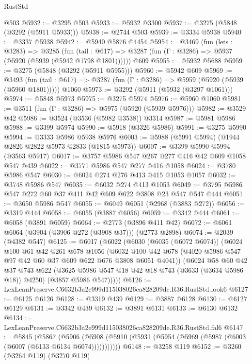\begin{lexlean}{RustStd}
\begin{coremodule}
    @503
@5932 := @3295 @503
@5933 := @5932 @3300
@5937 := @3275 (@5848 (@3292 (@5911 @5933)))
@5938 := @2744 @503
@5939 := @3334 @5938
@5940 := @3337 @5938
@5942 := @5940 @5876 @4454
@5954 := @3469
    (fun (lets : @3283) =>
    @3285
      (fun (tail : @617) => @3287 (fun (Γ : @3286) => @5937 (@5920 (@5939 (@5942 @1798 @1801))))))
    @609
@5955 := @5932 @5688
@5959 := @3275 (@5848 (@3292 (@5911 @5955)))
@5960 := @5942 @609
@5969 := @3493
    (fun (tail : @617) => @3287 (fun (Γ : @3286) => @5959 (@5920 (@5939 (@5960 @1801)))))
    @1060
@5973 := @3292 (@5911 (@5932 (@3297 @1061)))
@5974 := @5848 @5973
@5975 := @3275 @5974
@5976 := @5960 @1060
@5981 := @3511 (fun (Γ : @3286) => @5975 (@5920 (@5939 @5976)))
@5982 := @3529 @42
@5986 := @3524 (@3536 (@5982 @3538)) @3314
@5987 := @5981 @5986
@5988 := @3399 @5974
@5990 := @5918 (@3326 @5986)
@5991 := @3275 @5990
@5994 := @3333 @5986 @5938 @5976
@6003 := @5988 (@5991 @5994) (@1944 @2826 @2822 @5973 @2833 (@1815 @5973))
@6007 := @3399 @5990 @5994 (@3563 @5917)
@6017 := @3757 @5986 @547 @267 @277 @416 @42 @609 @1058 @547 @439
@6022 := @3771 @5986 @547 @277 @416 @1058
@6024 := @3780 @5986 @547
@6030 := @6024 @274 @276 @413 @415 @1053 @1057
@6032 := @3748 @5986 @547
@6035 := @6032 @274 @413 @1053
@6049 := @3795 @5986 @547 @272 @60 @37 @411 @42 @609 @622 @3808 @23 @547 @547 @444
@6051 := @3650 @5986 @547
@6055 := @6049 @6051 (@2968 (@3883 @272))
@6056 := @3319 @444
@6058 := @6055 (@3887 @6056)
@6059 := @3342 @444
@6061 := @6058 (@3891 @6059)
@6064 := @2773 (@3896 @411 @42)
@6072 := @6061 @6064 (@3904 (@3906 @272 (@3908 @37))) (@2773 @2898)
@6074 := @2039 (@4382 @547)
@6125 := @6017
    (@6022
      (@6030
        (@6035 (@6072 @6074))
        (@6024
          @100
          @61
          @42
          @261
          @678
          @1056
          (@6032 @100 @42 @678 (@4020 @5986 @547 @97 @42 @60 @37 @609 @622 @676 @3808 @6051 @4041))
          (@6024
            @58
            @60
            @42
            @37
            @743
            @622
            (@3625 @5986 @547 @18 @42 @18 @743 (@3633 (@3634 @5986 @18)) @4250)
            (@3857 @5986 @547)))))
@6126 := LexLeanPreserve.C6632b3a2e999d115038026ca828209de.R36.RustStd.look6
@6127 := @6125 @6126
@6128 := @3319 @439
@6129 := @3887 @6128
@6130 := @6127 @6129
@6131 := @3342 @439
@6132 := @3891 @6131
@6133 := @6130 @6132
@6134 := LexLeanPreserve.C6632b3a2e999d115038026ca828209de.R36.RustStd.fal6
@6147 := @5845
    (@5867
      (@5906 (@5908 (@5910 (@5931 (@5954 (@5969 (@5987 (@6003 (@6007 (@6133 @6134 @6074)))))))))))
@6148 := @3258 @119
@6152 := @3260 (@3264 @119) (@3270 @119)

\end{coremodule}
\end{lexlean}
